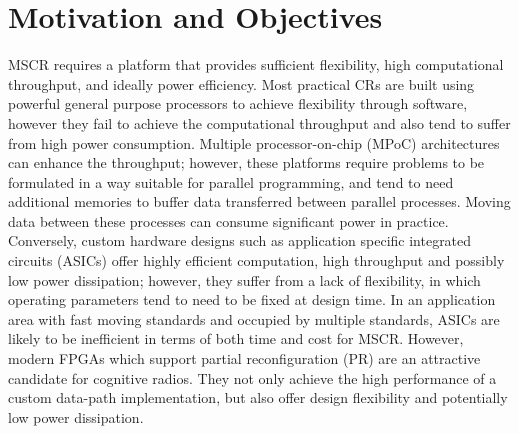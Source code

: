 \section{Motivation and Objectives}

MSCR requires a platform that provides sufficient flexibility, high computational throughput, and ideally power efficiency.
Most practical CRs are built using powerful general purpose processors to achieve flexibility through software, however they fail to achieve the computational throughput and also tend to suffer from high power consumption.
Multiple processor-on-chip (MPoC) architectures can enhance the throughput;
however, these platforms require problems to be formulated in a way suitable for parallel programming, and tend to need additional memories to buffer data transferred between parallel processes.
Moving data between these processes can consume significant power in practice.
Conversely, custom hardware designs such as application specific integrated circuits (ASICs) offer highly efficient computation, high throughput and possibly low power dissipation; however, they suffer from a lack of flexibility, in which operating parameters tend to need to be fixed at design time.
In an application area with fast moving standards and occupied by multiple standards, ASICs are likely to be inefficient in terms of both time and cost for MSCR.
However, modern FPGAs which support partial reconfiguration (PR) are an attractive candidate for cognitive radios.
They not only achieve the high performance of a custom data-path implementation, but also offer design flexibility and potentially low power dissipation.

